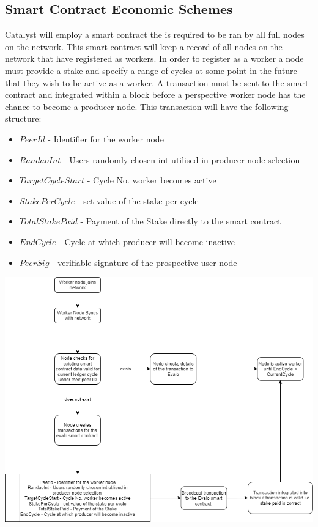 \subsection{Smart Contract Economic Schemes}

Catalyst will employ a smart contract the is required to be ran by all full nodes on the network. This smart contract will keep a record of all nodes on the network that have registered as workers. In order to register as a worker a node must provide a stake and specify a range of cycles at some point in the future that they wish to be active as a worker. A transaction must be sent to the smart contract and integrated within a block before a perspective worker node has the chance to become a producer node. This transaction will have the following structure: 


\begin{itemize} 

\item $PeerId$ - Identifier for the worker node
\item $RandaoInt$ - Users randomly chosen int utilised in producer node selection 
\item $TargetCycleStart$ - Cycle No. worker becomes active
\item $StakePerCycle$ - set value of the stake per cycle
\item $TotalStakePaid$ - Payment of the Stake directly to the smart contract 
\item $EndCycle$ - Cycle at which producer will become inactive
\item $PeerSig$ - verifiable signature of the prospective user node 

\end{itemize} 

\includegraphics[scale=.40]{Figures/WorkerRegistration.png}

